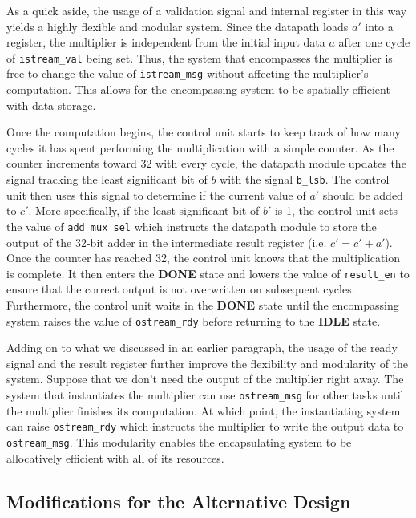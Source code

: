 \documentclass[10pt]{article}
\begin{document}
	As a quick aside, the usage of a validation signal and internal register in this way yields a highly flexible and modular system. Since the datapath loads $a'$ into a register, the multiplier is independent from the initial input data $a$ after one cycle of \texttt{istream\_val} being set. Thus, the system that encompasses the multiplier is free to change the value of \texttt{istream\_msg} without affecting the multiplier's computation. This allows for the encompassing system to be spatially efficient with data storage.

	Once the computation begins, the control unit starts to keep track of how many cycles it has spent performing the multiplication with a simple counter. As the counter increments toward 32 with every cycle, the datapath module updates the signal tracking the least significant bit of $b$ with the signal \texttt{b\_lsb}. The control unit then uses this signal to determine if the current value of $a'$ should be added to $c'$. More specifically, if the least significant bit of $b'$ is 1, the control unit sets the value of \texttt{add\_mux\_sel} which instructs the datapath module to store the output of the 32-bit adder in the intermediate result register (i.e. $c'=c'+a'$). Once the counter has reached 32, the control unit knows that the multiplication is complete. It then enters the \textbf{DONE} state and lowers the value of \texttt{result\_en} to ensure that the correct output is not overwritten on subsequent cycles. Furthermore, the control unit waits in the \textbf{DONE} state until the encompassing system raises the value of \texttt{ostream\_rdy} before returning to the \textbf{IDLE} state.

	Adding on to what we discussed in an earlier paragraph, the usage of the ready signal and the result register further improve the flexibility and modularity of the system. Suppose that we don't need the output of the multiplier right away. The system that instantiates the multiplier can use \texttt{ostream\_msg} for other tasks until the multiplier finishes its computation. At which point, the instantiating system can raise \texttt{ostream\_rdy} which instructs the multiplier to write the output data to \texttt{ostream\_msg}. This modularity enables the encapsulating system to be allocatively efficient with all of its resources. 

	\subsection{Modifications for the Alternative Design}
	\label{sec:alt_mods}
\end{document}

